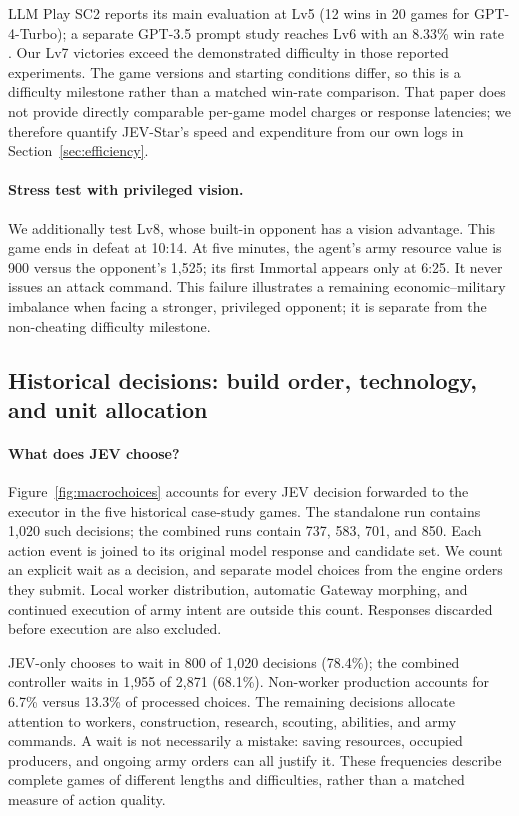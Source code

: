 \documentclass{article}
\begin{document}
LLM Play SC2 reports its main evaluation at Lv5 (12 wins in 20 games for GPT-4-Turbo); a separate GPT-3.5 prompt study reaches Lv6 with an 8.33\% win rate \citep{ma2023textsc2}. Our Lv7 victories exceed the demonstrated difficulty in those reported experiments. The game versions and starting conditions differ, so this is a difficulty milestone rather than a matched win-rate comparison. That paper does not provide directly comparable per-game model charges or response latencies; we therefore quantify JEV-Star's speed and expenditure from our own logs in Section~\ref{sec:efficiency}.

\paragraph{Stress test with privileged vision.}
We additionally test Lv8, whose built-in opponent has a vision advantage. This game ends in defeat at 10:14. At five minutes, the agent's army resource value is 900 versus the opponent's 1,525; its first Immortal appears only at 6:25. It never issues an attack command. This failure illustrates a remaining economic--military imbalance when facing a stronger, privileged opponent; it is separate from the non-cheating difficulty milestone.

\subsection{Historical decisions: build order, technology, and unit allocation}
\label{sec:macrochoices}

\paragraph{What does JEV choose?}
Figure~\ref{fig:macrochoices} accounts for every JEV decision forwarded to the executor in the five historical case-study games. The standalone run contains 1,020 such decisions; the combined runs contain 737, 583, 701, and 850. Each action event is joined to its original model response and candidate set. We count an explicit wait as a decision, and separate model choices from the engine orders they submit. Local worker distribution, automatic Gateway morphing, and continued execution of army intent are outside this count. Responses discarded before execution are also excluded.

JEV-only chooses to wait in 800 of 1,020 decisions (78.4\%); the combined controller waits in 1,955 of 2,871 (68.1\%). Non-worker production accounts for 6.7\% versus 13.3\% of processed choices. The remaining decisions allocate attention to workers, construction, research, scouting, abilities, and army commands. A wait is not necessarily a mistake: saving resources, occupied producers, and ongoing army orders can all justify it. These frequencies describe complete games of different lengths and difficulties, rather than a matched measure of action quality.
\end{document}
